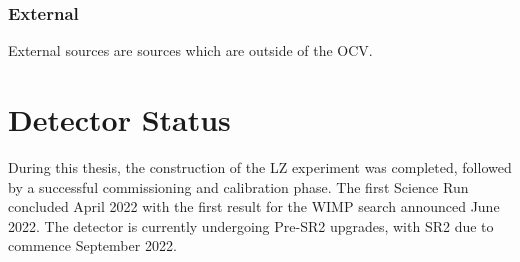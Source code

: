 \subsubsection{External}
\par
External sources are sources which are outside of the OCV.

\section{Detector Status}
\par
During this thesis, the construction of the LZ experiment was completed, followed by a successful commissioning and calibration phase.
The first Science Run concluded April 2022 with the first result for the WIMP search announced June 2022.
The detector is currently undergoing Pre-SR2 upgrades, with SR2 due to commence September 2022.

